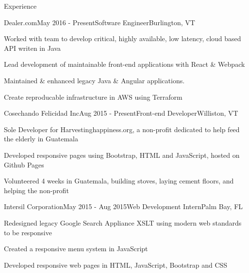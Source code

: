 \documentclass{resume} %
\begin{document}
\begin{rSection}{Experience}


\begin{rSubsection}{Dealer.com}{May 2016 - Present}{Software Engineer}{Burlington, VT}

\item Worked with team to develop critical, highly available, low latency, cloud based API writen in Java
\item Lead development of maintainable front-end applications with React \& Webpack
\item Maintained \& enhanced legacy Java \& Angular applications.
\item Create reproducable infrastructure in AWS using Terraform 

\end{rSubsection}

\begin{rSubsection}{Cosechando Felicidad Inc}{Aug 2015 - Present}{Front-end Developer}{Williston, VT}

\item Sole Developer for Harvestinghappiness.org, a non-profit dedicated to help feed the elderly in Guatemala
\item Developed responsive pages using Bootstrap, HTML and JavaScript, hosted on Github Pages
\item Volunteered 4 weeks in Guatemala, building stoves, laying cement floors, and helping the non-profit

\end{rSubsection}


\begin{rSubsection}{Intersil Corporation}{May 2015 - Aug 2015}{Web Development Intern}{Palm Bay, FL}

\item Redesigned legacy Google Search Appliance XSLT using modern web standards to be responsive
\item Created a responsive menu system in JavaScript
\item Developed responsive web pages in HTML, JavaScript, Bootstrap and CSS


\end{rSubsection}
\end{rSection}
\end{document}
